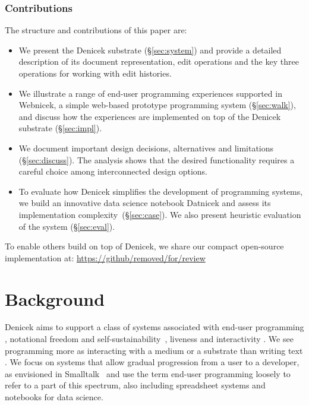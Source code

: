 \documentclass[sigconf,anonymous,screen]{acmart}
\begin{document}
\subsubsection*{Contributions}
The structure and contributions of this paper are:

\begin{itemize}
\item We present the Denicek substrate (\S\ref{sec:system}) and provide a detailed description of its
  document representation, edit operations and the key three operations for working with edit histories.
\item We illustrate a range of end-user programming experiences supported in Webnicek, a simple
  web-based prototype programming system (\S\ref{sec:walk}), and discuss how the experiences are
  implemented on top of the Denicek substrate (\S\ref{sec:impl}).
\item We document important design decisions, alternatives and limitations (\S\ref{sec:discuss}).
  The analysis shows that the desired functionality requires a careful choice among interconnected
  design options.
\item To evaluate how Denicek simplifies the development of program\-ming systems, we
  build an innovative data science notebook Datnicek and assess its implementation
  complexity~(\S\ref{sec:case}). We also present heuristic evaluation of the system (\S\ref{sec:eval}).
\end{itemize}

\noindent
To enable others build on top of Denicek, we share our compact open-source
implementation at: \url{https://github/removed/for/review} %


\section{Background}
\label{sec:background}
Denicek aims to support a class of systems associated with end-user programming \cite{myers-2006-eup},
notational freedom and self-sustainability~\cite{jakubovic-2023-techdims}, liveness and interactivity
\cite{horowitz-2023-qualities,rein-2019-live}. We see programming more as interacting with a medium
or a substrate \cite{kay-1977-media,klokmose-2015-webstrates} than writing text \cite{rpg-2012-revolution}.
We focus on systems that allow gradual progression from a user to a developer, as envisioned
in Smalltalk~\cite{reenskaug-1981-byte} and use the term end-user programming loosely to refer to a
part of this spectrum, also including spreadsheet systems and notebooks for data science.
\end{document}
